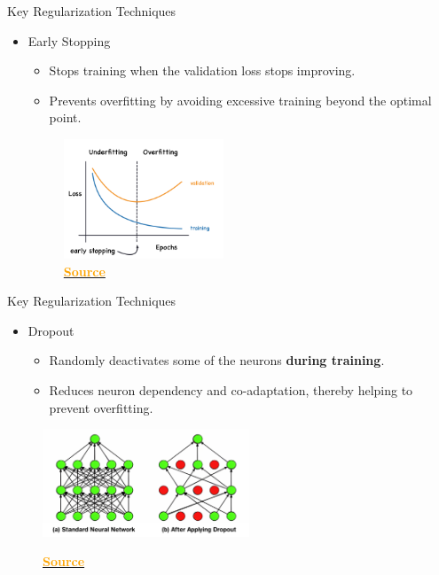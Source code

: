 \documentclass[serif, aspectratio=169]{beamer}
\begin{document}
\begin{frame}{Key Regularization Techniques}
    \begin{itemize}

            \item Early Stopping
            \begin{itemize}
                \item Stops training when the validation loss stops improving.
                \item Prevents overfitting by avoiding excessive training beyond the optimal point.
            \end{itemize}

            \begin{figure}
                \includegraphics[width=0.45\textwidth]{pic/Early-Stopping.png}
                 \caption{\href{https://www.kaggle.com/code/ryanholbrook/overfitting-and-underfitting}{\textcolor{orange}{\textbf{Source}}}}
                \label{fig:Early-Stopping}
            \end{figure}
            
    \end{itemize}
\end{frame}

\begin{frame}{Key Regularization Techniques}
\begin{itemize}
    \item Dropout
    \begin{itemize}
            \item Randomly deactivates some of the neurons \textbf{during training}.
            \item Reduces neuron dependency and co-adaptation, thereby helping to prevent overfitting.
    \end{itemize}
    \end{itemize}
                \begin{figure}
            \includegraphics[width=0.55\textwidth]{pic/Dropout.png}
            \label{fig:Dropout}
        \caption{\href{https://miro.medium.com/v2/resize:fit:640/format:webp/0*EY8R7nS10y5kQzOx}{\textcolor{orange}{\textbf{Source}}}}
        \end{figure}

\end{frame}
\end{document}

